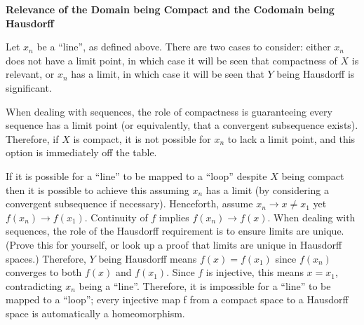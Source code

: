 \documentclass[a4paper,11pt]{article}
\begin{document}
\textbf{Relevance of the Domain being Compact and the Codomain being Hausdorff}

Let $x_n$ be a ``line'', as defined above. There are two cases to
consider: either $x_n$ does not have a limit point, in which case it
will be seen that compactness of $X$ is relevant, or $x_n$ has a
limit, in which case it will be seen that $Y$ being Hausdorff is
significant. 

When dealing with sequences, the role of compactness is guaranteeing
every sequence has a limit point (or equivalently, that a convergent
subsequence exists). Therefore, if $X$ is compact, it is not possible
for $x_n$ to lack a limit point, and this option is immediately off
the table.

If it is possible for a ``line'' to be mapped to a ``loop'' despite
$X$ being compact then it is possible to achieve this assuming $x_n$
has a limit (by considering a convergent subsequence if
necessary). Henceforth, assume $x_n \rightarrow x \neq x_1$ yet
$f(x_n) \rightarrow f(x_1)$. Continuity of $f$ implies $f(x_n)
\rightarrow f(x)$. When dealing with sequences, the role of the
Hausdorff requirement is to ensure limits are unique. (Prove this for
yourself, or look up a proof that limits are unique in Hausdorff
spaces.) Therefore, $Y$ being Hausdorff means $f(x) = f(x_1)$ since
$f(x_n)$ converges to both $f(x)$ and $f(x_1)$. Since $f$ is
injective, this means $x = x_1$, contradicting $x_n$ being a
``line''. Therefore, it is impossible for a ``line'' to be mapped to a
``loop''; every injective map f from a compact space to a Hausdorff
space is automatically a homeomorphism.
\end{document}
